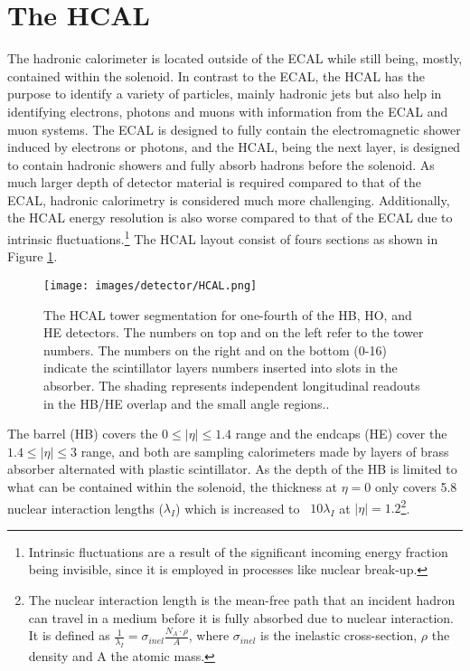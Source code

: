\section{The HCAL}
\noindent\justify
The hadronic calorimeter is located outside of the ECAL while still being, mostly, contained within the solenoid.
In contrast to the ECAL, the HCAL has the purpose to identify a variety of particles, mainly hadronic jets but also help in identifying electrons, photons and muons with information from the ECAL and muon systems. 
The ECAL is designed to fully contain the electromagnetic shower induced by electrons or photons, and the HCAL, being the next layer, is designed to contain hadronic showers and fully absorb hadrons before the solenoid. 
As much larger depth of detector material is required compared to that of the ECAL, hadronic calorimetry is considered much more challenging. 
Additionally, the HCAL energy resolution is also worse compared to that of the ECAL due to intrinsic fluctuations.\footnote{Intrinsic fluctuations are a result of the significant incoming energy fraction being invisible, since it is employed in processes like nuclear break-up.}
The HCAL layout consist of fours sections as shown in Figure \ref{fig:HCAL}. 
\begin{figure}[!htp]
  \centering
   \texttt{[image: images/detector/HCAL.png]}
   \caption{The HCAL tower segmentation for one-fourth of the HB, HO, and HE detectors. The numbers on top and on the left refer to the tower numbers. The numbers on the right and on the bottom (0-16) indicate the scintillator layers numbers inserted into slots in the absorber. The shading represents independent longitudinal readouts in the HB/HE overlap and the small angle regions.\cite{Baiatian:2007xva}.}
   \label{fig:HCAL}
\end{figure}                                                                                            
The barrel (HB) covers the $0\leq|\eta|\leq1.4$ range and the endcaps (HE) cover the $1.4\leq|\eta|\leq3$ range, and both are sampling calorimeters made by layers of brass absorber alternated with plastic scintillator. 
As the depth of the HB is limited to what can be contained within the solenoid, the thickness at $\eta=0$ only covers 5.8 nuclear interaction lengths ($\lambda_{I}$) which is increased to ~$10\lambda_{I}$ at $|\eta|=1.2$\footnote{The nuclear interaction length is the mean-free path that an incident hadron can travel in a medium before it is fully absorbed due to nuclear interaction. It is defined as $\frac{1}{\lambda_{I}}=\sigma_{inel}\frac{N_{A}\cdot\rho}{A}$, where $\sigma_{inel}$ is the inelastic cross-section, $\rho$ the density and A the atomic mass.}. 
